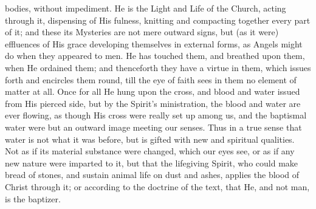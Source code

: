 bodies, without impediment. He is the Light and Life of the Church,
acting through it, dispensing of His fulness, knitting and compacting
together every part of it; and these its Mysteries are not mere
outward signs, but (as it were) effluences of His grace developing
themselves in external forms, as Angels might do when they appeared to
men. He has touched them, and breathed upon them, when He ordained
them; and thenceforth they have a virtue in them, which issues forth
and encircles them round, till the eye of faith sees in them no
element of matter at all. Once for all He hung upon the cross, and
blood and water issued from His pierced side, but by the Spirit's
ministration, the blood and water are ever flowing, as though His
cross were really set up among us, and the baptismal water were but an
outward image meeting our senses. Thus in a true sense that water is
not what it was before, but is gifted with new and spiritual
qualities. Not as if its material substance were changed, which our
eyes see, or as if any new nature were imparted to it, but that the
lifegiving Spirit, who could make bread of stones, and sustain animal
life on dust and ashes, applies the blood of Christ through it; or
according to the doctrine of the text, that He, and not man, is the
baptizer.

